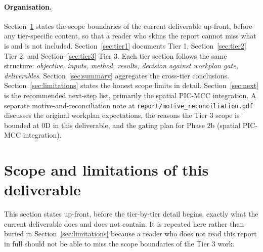 \documentclass[11pt,a4paper]{article}
\begin{document}
\paragraph{Organisation.} Section~\ref{sec:scope} states the
scope boundaries of the current deliverable up-front, before any
tier-specific content, so that a reader who skims the report
cannot miss what is and is not included. Section~\ref{sec:tier1}
documents Tier 1, Section~\ref{sec:tier2} Tier 2, and
Section~\ref{sec:tier3} Tier 3. Each tier section follows the
same structure: \emph{objective, inputs, method, results,
decision against workplan gate, deliverables}.
Section~\ref{sec:summary} aggregates the cross-tier conclusions.
Section~\ref{sec:limitations} states the honest scope limits in
detail. Section~\ref{sec:next} is the recommended next-step
list, primarily the spatial PIC-MCC integration. A separate
motive-and-reconciliation note at
\texttt{report/motive\_reconciliation.pdf} discusses the
original workplan expectations, the reasons the Tier 3 scope is
bounded at 0D in this deliverable, and the gating plan for
Phase 2b (spatial PIC-MCC integration).

\section{Scope and limitations of this deliverable}
\label{sec:scope}

This section states up-front, before the tier-by-tier detail
begins, exactly what the current deliverable does and does not
contain. It is repeated here rather than buried in
Section~\ref{sec:limitations} because a reader who does not read
this report in full should not be able to miss the scope
boundaries of the Tier 3 work.
\end{document}
